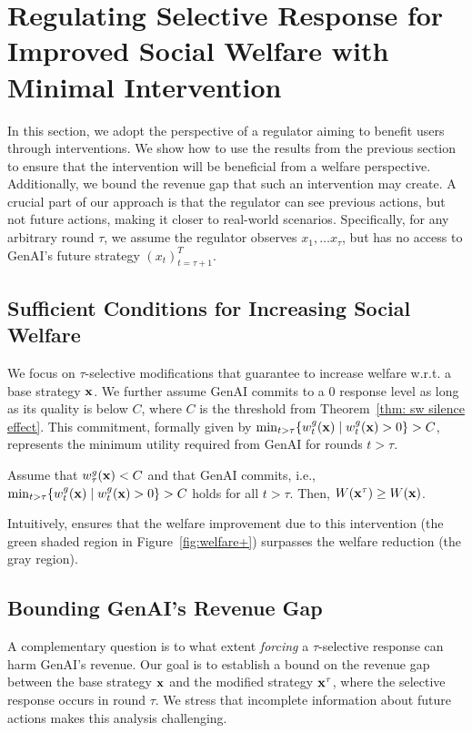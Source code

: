 \section{Regulating Selective Response for Improved Social Welfare with Minimal Intervention} \label{sec: regulation}
In this section, we adopt the perspective of a regulator aiming to benefit users through interventions. We show how to use the results from the previous section to ensure that the intervention will be beneficial from a welfare perspective. Additionally, we bound the revenue gap that such an intervention may create. A crucial part of our approach is that the regulator can see previous actions, but not future actions, making it closer to real-world scenarios. Specifically, for any arbitrary round $\tau$, we assume the regulator observes $x_1, \dots x_{\tau}$, but has no access to GenAI's future strategy $(x_{t})_{t = \tau + 1}^T$. 
\subsection{Sufficient Conditions for Increasing Social Welfare}
We focus on $\tau$-selective modifications that guarantee to increase welfare w.r.t. a base strategy ${\bf{x}}$. We further assume GenAI commits to a 0 response level as long as its quality is below $C$, where $C$ is the threshold from Theorem~\ref{thm: sw silence effect}. %
This commitment, formally given by $\min_{t > \tau} \{w^g_t({\bf{x}}) \mid w^g_t({\bf{x}}) > 0\} > C$, represents the minimum utility required from GenAI for rounds $t > \tau$. %
\begin{corollary}\label{cor: welfare suficient condition}
Assume that $w^g_\tau({\bf{x}}) < C$ and that GenAI commits, i.e., $\min_{t > \tau} \{w^g_t({\bf{x}}) \mid w^g_t({\bf{x}}) > 0\} > C$ holds for all $t > \tau$. Then, $W({\bf{x}}^\tau) \geq W({\bf{x}})$.
\end{corollary}
Intuitively,  ensures that the welfare improvement due to this intervention (the green shaded region in Figure~\ref{fig:welfare+}) surpasses the welfare reduction (the gray region).
\subsection{Bounding GenAI's Revenue Gap} \label{sec: rev diff}
A complementary question is to what extent \emph{forcing} a $\tau$-selective response can harm GenAI's revenue. Our goal is to establish a bound on the revenue gap between the base strategy ${\bf{x}}$ and the modified strategy ${\bf{x}}^\tau$, where the selective response occurs in round $\tau$. We stress that incomplete information about future actions makes this analysis challenging. 

